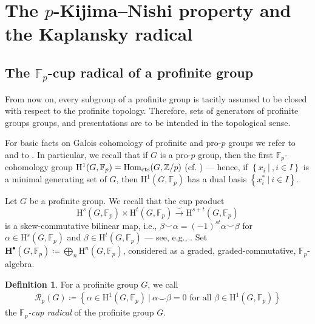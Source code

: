 \documentclass{amsart}
\theoremstyle{definition}
\newtheorem{defn}[thm]{Definition}
\theoremstyle{remark}
\newcommand{\KK}{\mathbb{K}}
\newcommand{\ZZ}{\mathbb{Z}}
\newcommand{\FF}{\mathbb{F}}
\newcommand{\calR}{\mathcal{R}}
\newcommand{\rmH}{\mathrm H}%
\newcommand{\bfH}{\mathbf{H}^\bullet}%
\newcommand{\set}[2]{\left\lbrace{#1}\ \big\vert\ {#2}\right\rbrace}
\newcommand{\Z}{\ZZ}
\newcommand{\F}{\FF}
\begin{document}
\section{The \texorpdfstring{$p$}{}-Kijima--Nishi property and the Kaplansky radical}
\label{sec:p Kijima Nishi and Kaplansky Radical}

\subsection{The \texorpdfstring{$\FF_p$}{}-cup radical of a profinite group}


From now on, every subgroup of a profinite group is tacitly assumed to be closed with respect to the profinite topology. Therefore, sets of generators of profinite groups groups, and presentations are to be intended in the topological sense.


For basic facts on Galois cohomology of profinite and pro-$p$ groups we refer to \cite[Ch.~I, \S~1--4]{serre:galc} and to \cite[Ch.~I, \S~1--6 and Ch.~III, \S~9]{NSW2008}.
{ In particular, we recall that if $G$ is a pro-$p$ group, then the first $\F_p$-cohomology group $\rmH^1(G,\F_p)=\mathrm{Hom}_{\rm cts}(G,\Z/p)$ (cf. \cite[Ch.~I, \S~4.2]{serre:galc}) --- hence, if $\set{x_i}{,i\in I}$ is a minimal generating set of $G$, then $\rmH^1(G,\F_p)$ has a dual basis $\set{x_i^\ast}{ i\in I}$.}


Let $G$ be a profinite group. We recall that the cup product
\[
\rmH^s(G,\FF_p)\times \rmH^t(G,\FF_p)\overset{\smallsmile}{\longrightarrow} \rmH^{s+t}(G,\FF_p)
\]
is a skew-commutative bilinear map, i.e., $\beta\smallsmile\alpha=(-1)^{st}\alpha\smallsmile\beta$ for $\alpha\in\rmH^s(G,\FF_p)$ and $\beta\in\rmH^t(G,\FF_p)$ --- see, e.g., \cite[Ch.~I, \S~4]{NSW2008}.
{ Set $\bfH(G,\F_p)\coloneq \bigoplus_{n}\rmH^n(G,\F_p)$, considered as a graded, graded-commutative, $\F_p$-algebra.}

\begin{defn}
    \label{defn:Fp cup radical}
    For a profinite group $G$, we call
    \begin{align*}
        \calR_p(G)\coloneq \set{\alpha\in \rmH^1(G,\FF_p)}{\alpha \smallsmile\beta=0\text{ for all }\beta\in \rmH^1(G,\FF_p)}
        \end{align*}
    the \emph{$\FF_p$-cup radical} of the profinite group $G$.
\end{defn}
\end{document}
